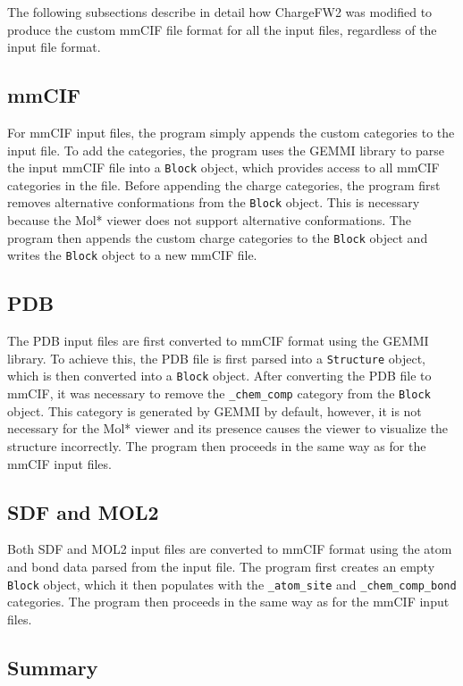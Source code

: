 \documentclass[
  digital,     %
  oneside,     %
  nosansbold,  %
  nocolorbold, %
  lof,         %
  lot,         %
]{fithesis4}
\begin{document}
The following subsections describe in detail how ChargeFW2 was modified to produce the custom mmCIF file format for all the input files, regardless of the input file format.

\subsection*{mmCIF}

For mmCIF input files, the program simply appends the custom categories to the input file. To add the categories, the program uses the GEMMI library \parencite{wojdyr2022gemmi} to parse the input mmCIF file into a \texttt{Block} object, which provides access to all mmCIF categories in the file. Before appending the charge categories, the program first removes alternative conformations from the \texttt{Block} object. This is necessary because the Mol* viewer does not support alternative conformations. The program then appends the custom charge categories to the \texttt{Block} object and writes the \texttt{Block} object to a new mmCIF file.

\subsection*{PDB}

The PDB input files are first converted to mmCIF format using the GEMMI library. To achieve this, the PDB file is first parsed into a \texttt{Structure} object, which is then converted into a \texttt{Block} object. After converting the PDB file to mmCIF, it was necessary to remove the \texttt{\_chem\_comp} category from the \texttt{Block} object. This category is generated by GEMMI by default, however, it is not necessary for the Mol* viewer and its presence causes the viewer to visualize the structure incorrectly. The program then proceeds in the same way as for the mmCIF input files.

\subsection*{SDF and MOL2}

Both SDF and MOL2 input files are converted to mmCIF format using the atom and bond data parsed from the input file. The program first creates an empty \texttt{Block} object, which it then populates with the \texttt{\_atom\_site} and \texttt{\_chem\_comp\_bond} categories. The program then proceeds in the same way as for the mmCIF input files.

\subsection*{Summary}
\end{document}
